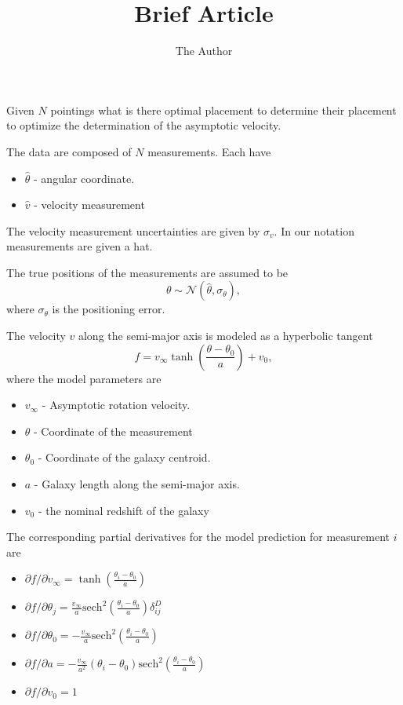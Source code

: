 \documentclass[11pt, oneside]{article}   	%
\title{Brief Article}
\author{The Author}
\begin{document}
\maketitle

Given $N$ pointings what is there optimal placement to determine their placement to optimize the determination of the asymptotic velocity.

The data are composed of $N$ measurements.  Each have
\begin{itemize}
\item $\hat{\theta}$ - angular coordinate.
\item $\hat{v}$ - velocity measurement
\end{itemize}
The velocity measurement uncertainties are given by $\sigma_v$.  In our notation measurements are given a hat.

The true positions of the measurements are assumed to be
\begin{equation}
\theta \sim \mathcal{N}(\hat{\theta},\sigma_\theta),
\end{equation}
where $\sigma_\theta$ is the positioning error.

The velocity $v$ along the semi-major axis is modeled as a hyperbolic tangent
\begin{equation}
f=v_\infty \tanh{\left(\frac{\theta - \theta_0}{a}\right)} + v_0,
\end{equation}
where the model parameters are
\begin{itemize}
\item $v_\infty$ - Asymptotic rotation velocity.
\item $\theta$ - Coordinate of the measurement
\item $\theta_0$ - Coordinate of the galaxy centroid. 
\item $a$ - Galaxy length along the semi-major axis.
\item $v_0$ - the nominal redshift of the galaxy
\end{itemize}
The corresponding partial derivatives for the model prediction for measurement $i$ are
\begin{itemize}
\item $\partial f/ \partial v_\infty =  \tanh{\left(\frac{\theta_i - \theta_0}{a}\right)}$
\item $\partial f/ \partial\theta_j = \frac{v_\infty }{a} \text{sech}^2{\left(\frac{\theta_i - \theta_0}{a}\right)} \delta^D_{ij}$ 
\item $\partial f/ \partial\theta_0 = -\frac{v_\infty }{a} \text{sech}^2{\left(\frac{\theta_i - \theta_0}{a}\right)}$ 
\item $\partial f/ \partial a =-\frac{v_\infty }{a^2} (\theta_i - \theta_0)\text{sech}^2{\left(\frac{\theta_i - \theta_0}{a}\right)}$
\item $\partial f/ \partial v_0 =1$
\end{itemize}
\end{document}
